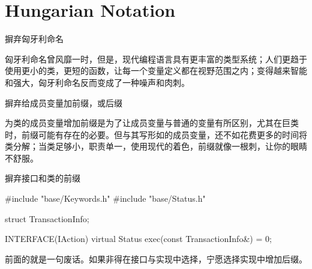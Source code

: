 \section{Hungarian Notation}
\begin{content}

\begin{regulation}
摒弃匈牙利命名
\end{regulation}

匈牙利命名曾风靡一时，但是，现代编程语言具有更丰富的类型系统；人们更趋于使用更小的类，更短的函数，让每一个变量定义都在视野范围之内；变得越来智能和强大，匈牙利命名反而变成了一种噪声和肉刺。

\begin{regulation}
摒弃给成员变量加前缀，或后缀
\end{regulation}

为类的成员变量增加前缀是为了让成员变量与普通的变量有所区别，尤其在巨类时，前缀可能有存在的必要。但与其写形如的成员变量，还不如花费更多的时间将类分解；当类足够小，职责单一，使用现代的着色，前缀就像一根刺，让你的眼睛不舒服。

\begin{regulation}
摒弃接口和类的前缀
\end{regulation}

\begin{leftbar}
\begin{c++}
#include "base/Keywords.h"
#include "base/Status.h"

struct TransactionInfo;

INTERFACE(IAction)
{
    virtual Status exec(const TransactionInfo&) = 0;
}
\end{c++}
\end{leftbar}

前面的就是一句废话。如果非得在接口与实现中选择，宁愿选择实现中增加后缀。

\end{content}
